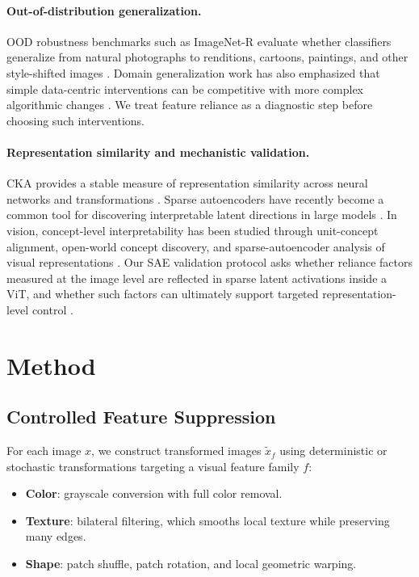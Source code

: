 \documentclass[letterpaper]{article}
\begin{document}
\paragraph{Out-of-distribution generalization.}
OOD robustness benchmarks such as ImageNet-R evaluate whether classifiers
generalize from natural photographs to renditions, cartoons, paintings, and
other style-shifted images \cite{hendrycks2021many}. Domain generalization work
has also emphasized that simple data-centric interventions can be competitive
with more complex algorithmic changes \cite{gulrajani2021search}. We treat
feature reliance as a diagnostic step before choosing such interventions.

\paragraph{Representation similarity and mechanistic validation.}
CKA provides a stable measure of representation similarity across neural
networks and transformations \cite{kornblith2019similarity}. Sparse
autoencoders have recently become a common tool for discovering interpretable
latent directions in large models \cite{cunningham2024sparse}. In vision,
concept-level interpretability has been studied through unit-concept alignment,
open-world concept discovery, and sparse-autoencoder analysis of visual
representations \cite{bau2017network,kowal2024vcc,stevens2025saev}. Our SAE
validation protocol asks whether reliance factors measured at the image level
are reflected in sparse latent activations inside a ViT, and whether such
factors can ultimately support targeted representation-level control
\cite{flovik2025salve}.

\section{Method}

\subsection{Controlled Feature Suppression}

For each image $x$, we construct transformed images $\tilde{x}_f$ using
deterministic or stochastic transformations targeting a visual feature family
$f$:
\begin{itemize}
    \item \textbf{Color}: grayscale conversion with full color removal.
    \item \textbf{Texture}: bilateral filtering, which smooths local texture
    while preserving many edges.
    \item \textbf{Shape}: patch shuffle, patch rotation, and local geometric
    warping.
\end{itemize}
\end{document}

